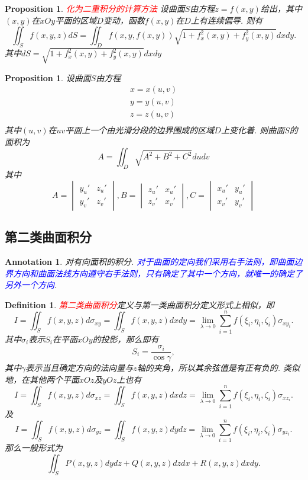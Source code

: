 \documentclass{article}
\newtheorem{proposition}[theorem]{Proposition}
\newtheorem{definition}[theorem]{Definition}
\newtheorem{annotation}[theorem]{Annotation}
\newcommand{\redt}[1]{\textcolor{red}{#1}}
\newcommand{\bluet}[1]{\textcolor{blue}{#1}}
\begin{document}
\begin{proposition}
\rm \redt{化为二重积分的计算方法} 设曲面$S$由方程$z=f(x,y)$给出，其中$(x,y)$在$xOy$平面的区域$D$变动，函数$f(x,y)$在$D$上有连续偏导. 则有
$$
\iint_S f(x,y,z)dS = \iint_D f(x,y,f(x,y))\sqrt{1+f_x^2(x,y)+f_y^2(x,y)}dxdy. 
$$
其中$dS = \sqrt{1+f_x^2(x,y)+f_y^2(x,y)}dxdy$
\end{proposition}

\begin{proposition}
\rm 设曲面$S$由方程
$$
\begin{array}{ll}
x = x(u,v) \\
y = y(u,v) \\
z = z(u,v) \\
\end{array}
$$
其中$(u,v)$在$uv$平面上一个由光滑分段的边界围成的区域$D$上变化着. 则曲面$S$的面积为
$$
A = \iint_D \sqrt{A^2 + B^2 + C^2}dudv
$$
其中
$$
A = \begin{vmatrix}
y_u' & z_u' \\
y_v' & z_v'
\end{vmatrix},
B = \begin{vmatrix}
z_u' & x_u' \\
z_v' & x_v'
\end{vmatrix},
C = \begin{vmatrix}
x_u' & y_u' \\
x_v' & y_v'
\end{vmatrix}
$$
\end{proposition}

\subsection{第二类曲面积分}

\begin{annotation}
\rm 对有向面积的积分. \bluet{对于曲面的定向我们采用右手法则，即曲面边界方向和曲面法线方向遵守右手法则，只有确定了其中一个方向，就唯一的确定了另外一个方向}.
\end{annotation}

\begin{definition}
\rm \redt{第二类曲面积分}定义与第一类曲面积分定义形式上相似，即
$$
I = \iint_{S} f(x,y,z)d\sigma_{xy} =\iint_{S} f(x,y,z)dxdy= \lim\limits_{\lambda \to 0}\sum\limits_{i=1}^n f(\xi_i,\eta_i,\zeta_i)\sigma_{xy_i}.
$$
其中$\sigma_i$表示$S_i$在平面$xOy$的投影，那么即有
$$
S_i = \frac{\sigma_i}{\cos \gamma},
$$
其中$\gamma$表示当且确定方向的法向量与$z$轴的夹角，所以其余弦值是有正有负的. 类似地，在其他两个平面$xOz$及$yOz$上也有
$$
I = \iint_{S} f(x,y,z)d\sigma_{xz} =\iint_{S} f(x,y,z)dxdz= \lim\limits_{\lambda \to 0}\sum\limits_{i=1}^n f(\xi_i,\eta_i,\zeta_i)\sigma_{xz_i}.
$$
及
$$
I = \iint_{S} f(x,y,z)d\sigma_{yz} =\iint_{S} f(x,y,z)dydz= \lim\limits_{\lambda \to 0}\sum\limits_{i=1}^n f(\xi_i,\eta_i,\zeta_i)\sigma_{yz_i}.
$$
那么一般形式为
$$
\iint_{S} P(x,y,z)dydz + Q(x,y,z)dzdx + R(x,y,z)dxdy.  
$$
\end{definition}
\end{document}
